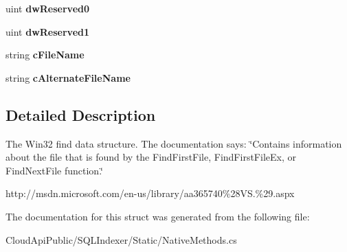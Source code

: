 \begin{DoxyCompactItemize}
\item 
\hypertarget{struct_s_q_l_indexer_1_1_static_1_1_native_methods_1_1_w_i_n32___f_i_n_d___d_a_t_a_a771bc5a7c1d1df5d7e7a6855a01f48d1}{uint {\bfseries dw\-Reserved0}}\label{struct_s_q_l_indexer_1_1_static_1_1_native_methods_1_1_w_i_n32___f_i_n_d___d_a_t_a_a771bc5a7c1d1df5d7e7a6855a01f48d1}

\item 
\hypertarget{struct_s_q_l_indexer_1_1_static_1_1_native_methods_1_1_w_i_n32___f_i_n_d___d_a_t_a_a4259bcf19ef658e7b5db33d2d4663745}{uint {\bfseries dw\-Reserved1}}\label{struct_s_q_l_indexer_1_1_static_1_1_native_methods_1_1_w_i_n32___f_i_n_d___d_a_t_a_a4259bcf19ef658e7b5db33d2d4663745}

\item 
\hypertarget{struct_s_q_l_indexer_1_1_static_1_1_native_methods_1_1_w_i_n32___f_i_n_d___d_a_t_a_a61c8977ee9386a399f4cb463c058784c}{string {\bfseries c\-File\-Name}}\label{struct_s_q_l_indexer_1_1_static_1_1_native_methods_1_1_w_i_n32___f_i_n_d___d_a_t_a_a61c8977ee9386a399f4cb463c058784c}

\item 
\hypertarget{struct_s_q_l_indexer_1_1_static_1_1_native_methods_1_1_w_i_n32___f_i_n_d___d_a_t_a_a06520c8ffbd5959e5dbc69988100eff5}{string {\bfseries c\-Alternate\-File\-Name}}\label{struct_s_q_l_indexer_1_1_static_1_1_native_methods_1_1_w_i_n32___f_i_n_d___d_a_t_a_a06520c8ffbd5959e5dbc69988100eff5}

\end{DoxyCompactItemize}


\subsection{Detailed Description}
The Win32 find data structure. The documentation says\-: \char`\"{}\-Contains information about the file that is found by the Find\-First\-File, Find\-First\-File\-Ex, or Find\-Next\-File function.\char`\"{} 

http\-://msdn.\-microsoft.\-com/en-\/us/library/aa365740\%28\-V\-S.\%29.\-aspx 

The documentation for this struct was generated from the following file\-:\begin{DoxyCompactItemize}
\item 
Cloud\-Api\-Public/\-S\-Q\-L\-Indexer/\-Static/Native\-Methods.\-cs\end{DoxyCompactItemize}

